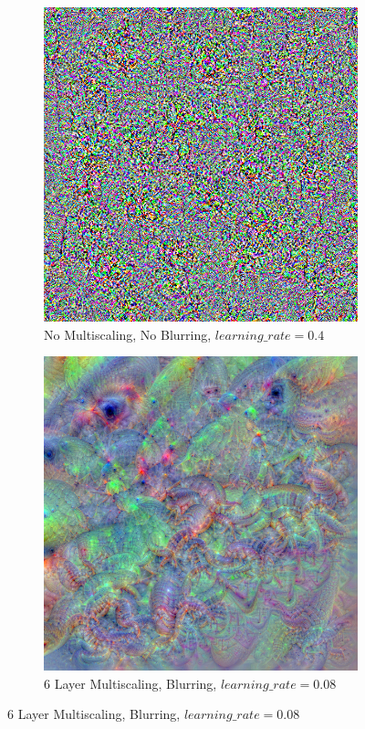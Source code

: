 \newpage
\begin{figure}
    \captionsetup{justification=centering}

    \begin{subfigure}[t]{0.31\textwidth}
        \captionsetup{justification=centering}
        \centering
        \includegraphics[width=.7\linewidth]{figuras/feat_vis/experiments/final/l13/random_image_pl1_lr4e-1_layer28_no-blur.png}
        \caption{No Multiscaling, No Blurring, \(learning\_rate = 0.4\)}
    \end{subfigure}
    \hfill
    \begin{subfigure}[t]{0.31\textwidth}
        \captionsetup{justification=centering}
        \centering
        \includegraphics[width=.7\linewidth]{figuras/feat_vis/experiments/final/l13/random_image_pl6_lr8e-2_layer28_blur-0.4.png}
        \caption{6 Layer Multiscaling, Blurring, \(learning\_rate = 0.08\)}

\end{subfigure}
\end{figure}
